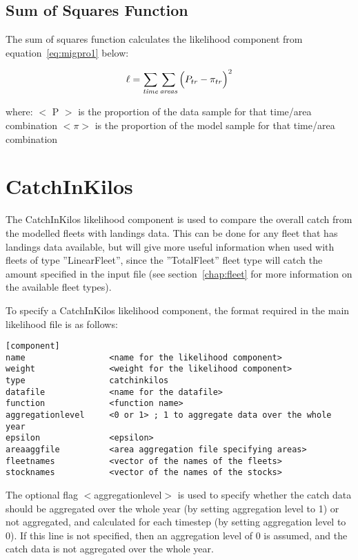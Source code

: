 \documentclass[10pt,twoside]{book}
\begin{document}
\subsection{Sum of Squares Function}
The sum of squares function calculates the likelihood component from equation~\ref{eq:migpro1} below:

\begin{equation}\label{eq:migpro1}
\ell = \sum_{\it time}\sum_{\it areas} \Big( P_{tr} - \pi_{tr} \Big) ^2
\end{equation}

where:\newline
$<$ P $>$ is the proportion of the data sample for that time/area combination\newline
$<\pi>$ is the proportion of the model sample for that time/area combination

\section{CatchInKilos}\label{sec:catchinkilos}
The CatchInKilos likelihood component is used to compare the overall catch from the modelled fleets with landings data.  This can be done for any fleet that has landings data available, but will give more useful information when used with fleets of type ''LinearFleet'', since the ''TotalFleet'' fleet type will catch the amount specified in the input file (see section~\ref{chap:fleet} for more information on the available fleet types).

\bigskip
To specify a CatchInKilos likelihood component, the format required in the main likelihood file is as follows:

{\small\begin{verbatim}
[component]
name                 <name for the likelihood component>
weight               <weight for the likelihood component>
type                 catchinkilos
datafile             <name for the datafile>
function             <function name>
aggregationlevel     <0 or 1> ; 1 to aggregate data over the whole year
epsilon              <epsilon>
areaaggfile          <area aggregation file specifying areas>
fleetnames           <vector of the names of the fleets>
stocknames           <vector of the names of the stocks>
\end{verbatim}}

The optional flag $<$aggregationlevel$>$ is used to specify whether the catch data should be aggregated over the whole year (by setting aggregation level to 1) or not aggregated, and calculated for each timestep (by setting aggregation level to 0).  If this line is not specified, then an aggregation level of 0 is assumed, and the catch data is not aggregated over the whole year.
\end{document}
